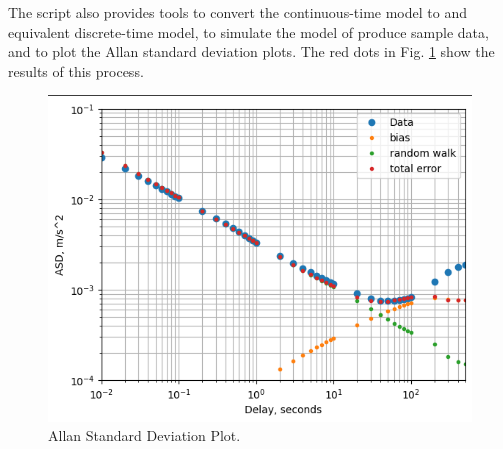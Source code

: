 \documentclass[letter,twocolumn]{article}
\begin{document}
The script also provides tools to convert the continuous-time model to and equivalent discrete-time model, to simulate the model of produce sample data, and to plot the Allan standard deviation plots. The red dots in Fig. \ref{fig:ASD_plot}  show the results of this process.

\begin{figure}[tbh]
	\centering
	\includegraphics[trim=0in 0in 0in 0.1in, clip, width=0.9\columnwidth]{figure/ASD_plot}
	\caption{Allan Standard Deviation Plot.}
	\label{fig:ASD_plot}
\end{figure}

\vfill



\end{document}
